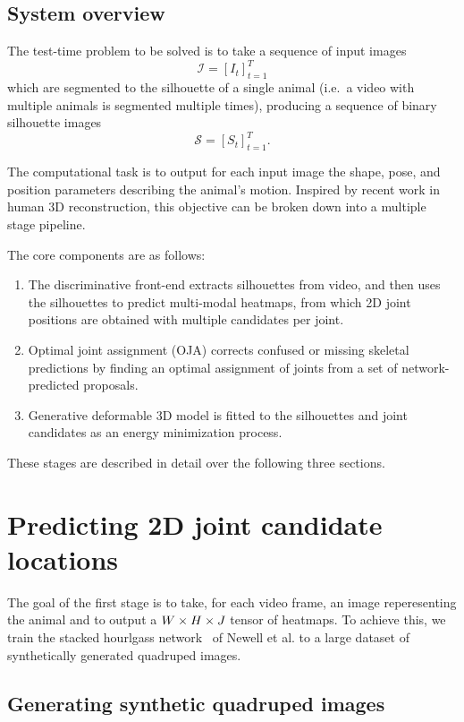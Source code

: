 \subsection{System overview}

\def\seq#1#2#3#4{\left[{#1_{#2}}\right]_{#2=#3}^{#4}}
The test-time problem to be solved is to take a sequence of input images
\[
\mathcal{I} = \seq{I}{t}{1}{T}
\]
which are segmented to the silhouette of a single animal (i.e.~a video with multiple animals is segmented multiple times), producing a sequence of binary silhouette images 
\[
\mathcal{S} = \seq{S}{t}{1}{T}.
\]

The computational task is to output for each input image the shape, pose, and position parameters describing the animal's motion. Inspired by recent work in human 3D reconstruction, this objective can be broken down into a multiple stage pipeline. 

The core components are as follows:

\begin{enumerate}
    \item The discriminative front-end extracts silhouettes from video, and then uses the silhouettes to predict multi-modal heatmaps, from which 2D joint positions are obtained with multiple candidates per joint. 
    \item Optimal joint assignment (OJA) corrects confused or missing skeletal predictions by finding an optimal assignment of joints from a set of network-predicted proposals. 
    \item Generative deformable 3D model is fitted to the silhouettes and joint candidates as an energy minimization process.
\end{enumerate}

These stages are described in detail over the following three sections.

\section{Predicting 2D joint candidate locations}

The goal of the first stage is to take, for each video frame, an image reperesenting the animal and to output a $W \times H \times J$ tensor of heatmaps. To achieve this, we train the stacked hourlgass network~\cite{newell2016stacked} of Newell et al. to a large dataset of synthetically generated quadruped images. 

\subsection{Generating synthetic quadruped images}

